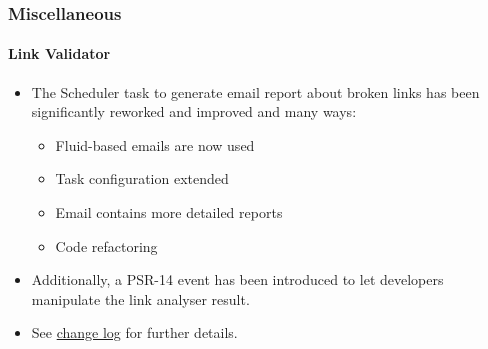 %

\begin{frame}[fragile]
	\frametitle{Miscellaneous}
	\framesubtitle{Link Validator}


	\begin{itemize}
		\item The Scheduler task to generate email report about broken links
			has been significantly reworked and improved and many ways:

			\begin{itemize}
				\item Fluid-based emails are now used
				\item Task configuration extended
				\item Email contains more detailed reports
				\item Code refactoring
			\end{itemize}

		\item Additionally, a PSR-14 event has been introduced to let developers
			manipulate the link analyser result.

		\item See \href{https://docs.typo3.org/c/typo3/cms-core/master/en-us/Changelog/11.0/Feature-29342-ImproveValidatorTask.html}{change log}
			for further details.

	\end{itemize}

\end{frame}

